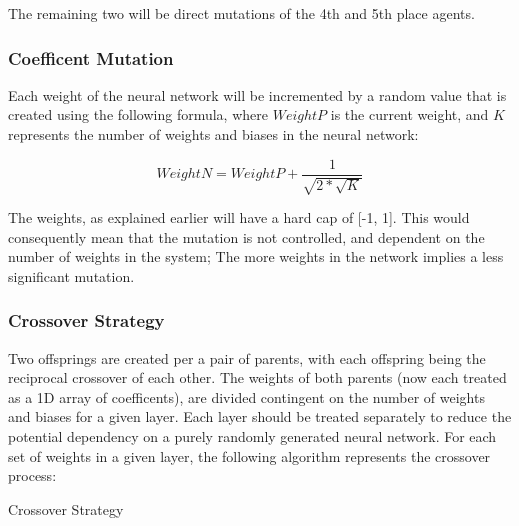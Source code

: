 \documentclass[12pt,a4paper]{article}
\makeatletter
\def\BState{\State\hskip-\ALG@thistlm}
\makeatother
\begin{document}
    The remaining two will be direct mutations of the 4th and 5th place agents.

\subsubsection{Coefficent Mutation}

    Each weight of the neural network will be incremented by a random value that is created using the following formula, where $WeightP$ is the current weight, and $K$ represents the number of weights and biases in the neural network:

    $$ WeightN = WeightP + \frac{1}{\sqrt{2 * \sqrt{K} }}$$

    The weights, as explained earlier will have a hard cap of [-1, 1]. This would consequently mean that the mutation is not controlled, and dependent on the number of weights in the system; The more weights in the network implies a less significant mutation.

\subsubsection{Crossover Strategy}

    Two offsprings are created per a pair of parents, with each offspring being the reciprocal crossover of each other. The weights of both parents (now each treated as a 1D array of coefficents), are divided contingent on the number of weights and biases for a given layer. Each layer should be treated separately to reduce the potential dependency on a purely randomly generated neural network. For each set of weights in a given layer, the following algorithm represents the crossover process:

    \begin{algorithm}
        \caption{Crossover Strategy}
    \end{algorithm}
\end{document}
